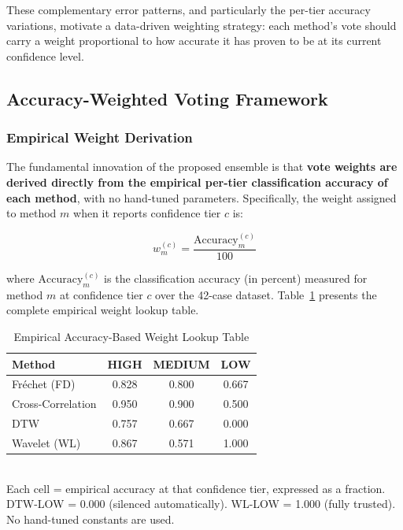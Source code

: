 \documentclass[journal]{IEEEtran}
\begin{document}
These complementary error patterns, and particularly the per-tier
accuracy variations, motivate a data-driven weighting strategy: each
method's vote should carry a weight proportional to how accurate it has
proven to be at its current confidence level.

\subsection{Accuracy-Weighted Voting Framework}

\subsubsection{Empirical Weight Derivation}

The fundamental innovation of the proposed ensemble is that
\textbf{vote weights are derived directly from the empirical per-tier
classification accuracy of each method}, with no hand-tuned parameters.
Specifically, the weight assigned to method $m$ when it reports
confidence tier $c$ is:

\begin{equation}
w_m^{(c)} = \frac{\text{Accuracy}_m^{(c)}}{100}
\end{equation}

\noindent where $\text{Accuracy}_m^{(c)}$ is the classification accuracy
(in percent) measured for method $m$ at confidence tier $c$ over the
42-case dataset. Table~\ref{tab:accuracy_weights} presents the complete
empirical weight lookup table.

\begin{table}[!t]
\centering
\caption{Empirical Accuracy-Based Weight Lookup Table}
\label{tab:accuracy_weights}
\begin{tabular}{@{}lccc@{}}
\toprule
\textbf{Method} & \textbf{HIGH} & \textbf{MEDIUM} & \textbf{LOW} \\
\midrule
Fr\'{e}chet (FD) & 0.828 & 0.800 & 0.667 \\
Cross-Correlation & 0.950 & 0.900 & 0.500 \\
DTW              & 0.757 & 0.667 & 0.000 \\
Wavelet (WL)     & 0.867 & 0.571 & 1.000 \\
\bottomrule
\end{tabular}
\\[0.5em]
\footnotesize{Each cell = empirical accuracy at that confidence tier,
expressed as a fraction. DTW-LOW = 0.000 (silenced automatically).
WL-LOW = 1.000 (fully trusted). No hand-tuned constants are used.}
\end{table}
\end{document}
